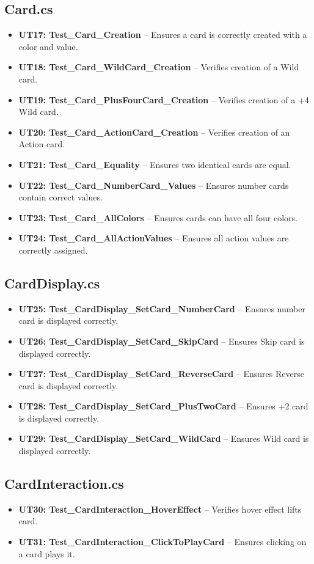 \documentclass[12pt, titlepage]{article}
\begin{document}
\subsection{Card.cs}
\begin{itemize}
    \item \textbf{UT17: Test\_Card\_Creation} -- Ensures a card is correctly created with a color and value.
    \item \textbf{UT18: Test\_Card\_WildCard\_Creation} -- Verifies creation of a Wild card.
    \item \textbf{UT19: Test\_Card\_PlusFourCard\_Creation} -- Verifies creation of a +4 Wild card.
    \item \textbf{UT20: Test\_Card\_ActionCard\_Creation} -- Verifies creation of an Action card.
    \item \textbf{UT21: Test\_Card\_Equality} -- Ensures two identical cards are equal.
    \item \textbf{UT22: Test\_Card\_NumberCard\_Values} -- Ensures number cards contain correct values.
    \item \textbf{UT23: Test\_Card\_AllColors} -- Ensures cards can have all four colors.
    \item \textbf{UT24: Test\_Card\_AllActionValues} -- Ensures all action values are correctly assigned.
\end{itemize}

\subsection{CardDisplay.cs}
\begin{itemize}
    \item \textbf{UT25: Test\_CardDisplay\_SetCard\_NumberCard} -- Ensures number card is displayed correctly.
    \item \textbf{UT26: Test\_CardDisplay\_SetCard\_SkipCard} -- Ensures Skip card is displayed correctly.
    \item \textbf{UT27: Test\_CardDisplay\_SetCard\_ReverseCard} -- Ensures Reverse card is displayed correctly.
    \item \textbf{UT28: Test\_CardDisplay\_SetCard\_PlusTwoCard} -- Ensures +2 card is displayed correctly.
    \item \textbf{UT29: Test\_CardDisplay\_SetCard\_WildCard} -- Ensures Wild card is displayed correctly.
\end{itemize}

\subsection{CardInteraction.cs}
\begin{itemize}
    \item \textbf{UT30: Test\_CardInteraction\_HoverEffect} -- Verifies hover effect lifts card.
    \item \textbf{UT31: Test\_CardInteraction\_ClickToPlayCard} -- Ensures clicking on a card plays it.
\end{itemize}
\end{document}
